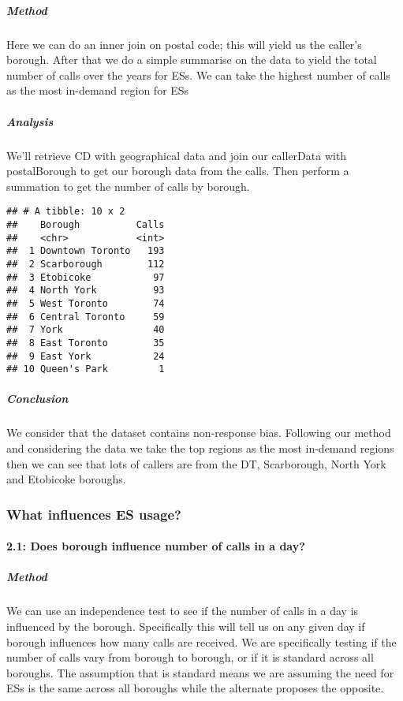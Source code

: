 \documentclass[
]{article}
\begin{document}
\hypertarget{method-2}{%
\subparagraph{Method}\label{method-2}}

Here we can do an inner join on postal code; this will yield us the
caller's borough. After that we do a simple summarise on the data to
yield the total number of calls over the years for ESs. We can take the
highest number of calls as the most in-demand region for ESs

\hypertarget{analysis-2}{%
\subparagraph{Analysis}\label{analysis-2}}

We'll retrieve CD with geographical data and join our callerData with
postalBorough to get our borough data from the calls. Then perform a
summation to get the number of calls by borough.

\begin{verbatim}
## # A tibble: 10 x 2
##    Borough          Calls
##    <chr>            <int>
##  1 Downtown Toronto   193
##  2 Scarborough        112
##  3 Etobicoke           97
##  4 North York          93
##  5 West Toronto        74
##  6 Central Toronto     59
##  7 York                40
##  8 East Toronto        35
##  9 East York           24
## 10 Queen's Park         1
\end{verbatim}

\hypertarget{conclusion-2}{%
\subparagraph{Conclusion}\label{conclusion-2}}

We consider that the dataset contains non-response bias. Following our
method and considering the data we take the top regions as the most
in-demand regions then we can see that lots of callers are from the DT,
Scarborough, North York and Etobicoke boroughs.

\hypertarget{what-influences-es-usage}{%
\subsubsection{What influences ES
usage?}\label{what-influences-es-usage}}

\hypertarget{does-borough-influence-number-of-calls-in-a-day}{%
\paragraph{2.1: Does borough influence number of calls in a
day?}\label{does-borough-influence-number-of-calls-in-a-day}}

\hypertarget{method-3}{%
\subparagraph{Method}\label{method-3}}

We can use an independence test to see if the number of calls in a day
is influenced by the borough. Specifically this will tell us on any
given day if borough influences how many calls are received. We are
specifically testing if the number of calls vary from borough to
borough, or if it is standard across all boroughs. The assumption that
is standard means we are assuming the need for ESs is the same across
all boroughs while the alternate proposes the opposite.
\end{document}

